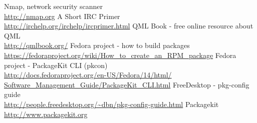 \begin{thebibliography}{xxxxxxxxxxxx}
%
%
 Nmap, network security scanner \\\url{http://nmap.org}
%
%
 A Short IRC Primer \\\url{http://irchelp.org/irchelp/ircprimer.html}
%
%
 QML Book - free online resource about QML\\\url{http://qmlbook.org/}
%
%
 Fedora project - how to build packages \\\url{https://fedoraproject.org/wiki/How_to_create_an_RPM_package}
 Fedora project - PackageKit CLI (pkcon) \\\url{http://docs.fedoraproject.org/en-US/Fedora/14/html/
Software_Management_Guide/PackageKit_CLI.html}
%
%
 FreeDesktop - pkg-config guide \\\url{http://people.freedesktop.org/~dbn/pkg-config-guide.html}
 Packagekit \\\url{http://www.packagekit.org}
%
%
\end{thebibliography}
